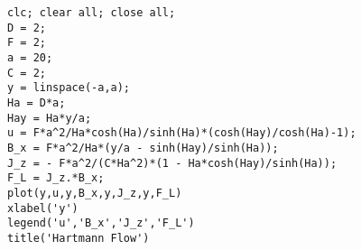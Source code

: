 \documentclass[11pt]{article}
\begin{document}
\begin{verbatim}
clc; clear all; close all;
D = 2;
F = 2;
a = 20;
C = 2;
y = linspace(-a,a);
Ha = D*a;
Hay = Ha*y/a;
u = F*a^2/Ha*cosh(Ha)/sinh(Ha)*(cosh(Hay)/cosh(Ha)-1);
B_x = F*a^2/Ha*(y/a - sinh(Hay)/sinh(Ha));
J_z = - F*a^2/(C*Ha^2)*(1 - Ha*cosh(Hay)/sinh(Ha));
F_L = J_z.*B_x;
plot(y,u,y,B_x,y,J_z,y,F_L)
xlabel('y')
legend('u','B_x','J_z','F_L')
title('Hartmann Flow')
\end{verbatim}

\end{document}
